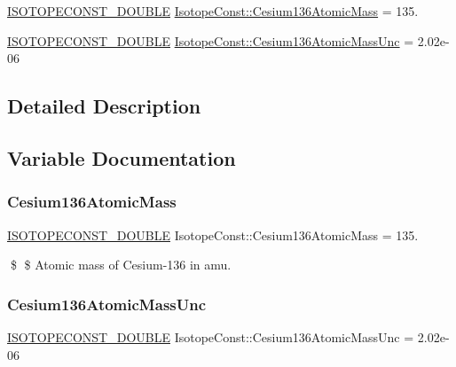 \begin{DoxyCompactItemize}
\item 
\mbox{\hyperlink{group___isotope_const-_macros_ga8f45a7272ce02c0b4c65c44636ed719a}{I\+S\+O\+T\+O\+P\+E\+C\+O\+N\+S\+T\+\_\+\+D\+O\+U\+B\+LE}} \mbox{\hyperlink{group___isotope_const-_cesium-_cs136_ga66121b0d252e67a063ba5075aa54e3b4}{Isotope\+Const\+::\+Cesium136\+Atomic\+Mass}} = 135.
\item 
\mbox{\hyperlink{group___isotope_const-_macros_ga8f45a7272ce02c0b4c65c44636ed719a}{I\+S\+O\+T\+O\+P\+E\+C\+O\+N\+S\+T\+\_\+\+D\+O\+U\+B\+LE}} \mbox{\hyperlink{group___isotope_const-_cesium-_cs136_gae150e59f905a4f505597198c36297d37}{Isotope\+Const\+::\+Cesium136\+Atomic\+Mass\+Unc}} = 2.\+02e-\/06
\end{DoxyCompactItemize}


\subsection{Detailed Description}


\subsection{Variable Documentation}
\mbox{\label{group___isotope_const-_cesium-_cs136_ga66121b0d252e67a063ba5075aa54e3b4}} 
\subsubsection{\texorpdfstring{Cesium136\+Atomic\+Mass}{Cesium136AtomicMass}}
{\footnotesize\ttfamily \mbox{\hyperlink{group___isotope_const-_macros_ga8f45a7272ce02c0b4c65c44636ed719a}{I\+S\+O\+T\+O\+P\+E\+C\+O\+N\+S\+T\+\_\+\+D\+O\+U\+B\+LE}} Isotope\+Const\+::\+Cesium136\+Atomic\+Mass = 135.}

\$ \$ Atomic mass of Cesium-\/136 in amu. \mbox{\label{group___isotope_const-_cesium-_cs136_gae150e59f905a4f505597198c36297d37}} 
\subsubsection{\texorpdfstring{Cesium136\+Atomic\+Mass\+Unc}{Cesium136AtomicMassUnc}}
{\footnotesize\ttfamily \mbox{\hyperlink{group___isotope_const-_macros_ga8f45a7272ce02c0b4c65c44636ed719a}{I\+S\+O\+T\+O\+P\+E\+C\+O\+N\+S\+T\+\_\+\+D\+O\+U\+B\+LE}} Isotope\+Const\+::\+Cesium136\+Atomic\+Mass\+Unc = 2.\+02e-\/06}

